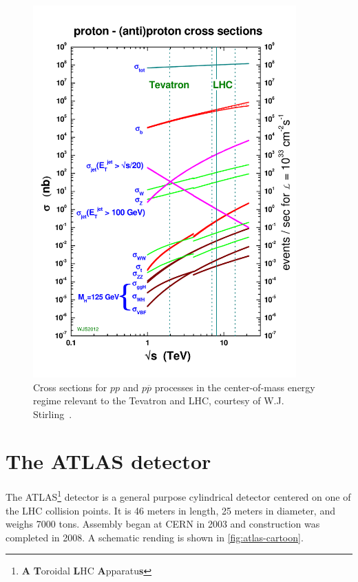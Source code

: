 \begin{figure}[tp]
  \centering
  \includegraphics[width=0.90\textwidth]{figures/lhc-atlas/crosssections2012_v5}
  \caption{Cross sections for $pp$ and $p\overline{p}$ processes in the center-of-mass energy regime relevant to the Tevatron and LHC, courtesy of W.J. Stirling~\cite{2013.stirling.cross-sections}.}
  \label{fig:lhc-stirling}
\end{figure}

\section{The ATLAS detector}
\label{sec:atlas}

The ATLAS\footnote{\textbf{A} \textbf{T}oroidal \textbf{L}HC \textbf{A}pparatu\textbf{s}} detector is a general purpose cylindrical detector centered on one of the LHC collision points. It is 46 meters in length, 25 meters in diameter, and weighs 7000 tons. Assembly began at CERN in 2003 and construction was completed in 2008. A schematic rending is shown in \cref{fig:atlas-cartoon}.


